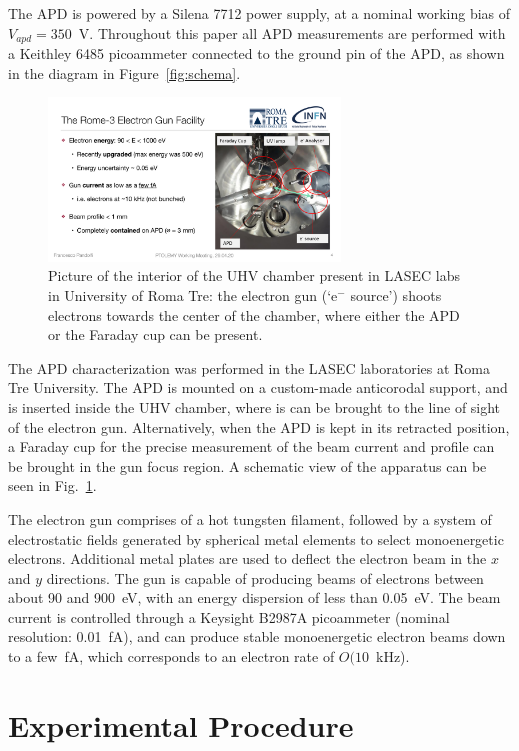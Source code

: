 \documentclass[12p]{paper}
\begin{document}
The APD is powered by a Silena 7712 power supply, at a nominal working bias of $V_{apd} = 350$~V. Throughout this paper all APD measurements are performed with a Keithley 6485 picoammeter connected to the ground pin of the APD, as shown in the diagram  in Figure~\ref{fig:schema}. 

\begin{figure}[tb]
  \centering
\includegraphics[width=0.69\textwidth]{figures/chamber_photo}
 \caption{Picture of the interior of the UHV chamber present in LASEC labs in University of Roma Tre: the electron gun (`e$^{-}$ source') shoots electrons towards the center of the chamber, where either the APD or the Faraday cup can be present.
  \label{fig:gun}}
\end{figure}


The APD characterization was performed in the LASEC laboratories at Roma Tre University. The APD is mounted on a custom-made anticorodal support, and is inserted inside the UHV chamber, where is can be brought to the line of sight of the electron gun. Alternatively, when the APD is kept in its retracted position, a Faraday cup for the precise measurement of the beam current and profile can be brought in the gun focus region. A schematic view of the apparatus can be seen in Fig.~\ref{fig:gun}.

The electron gun comprises of a hot tungsten filament, followed by a system of electrostatic fields generated by spherical metal elements to select monoenergetic electrons. Additional metal plates are used to deflect the electron beam in the $x$ and $y$ directions. The gun is capable of producing beams of electrons between about 90 and 900~eV, with an energy dispersion of less than 0.05~eV. The beam current is controlled through a Keysight B2987A picoammeter (nominal resolution: 0.01~fA), and can produce stable monoenergetic electron beams down to a few~fA, which corresponds to an electron rate of $O(10$~kHz).


\section{Experimental Procedure}
\end{document}

